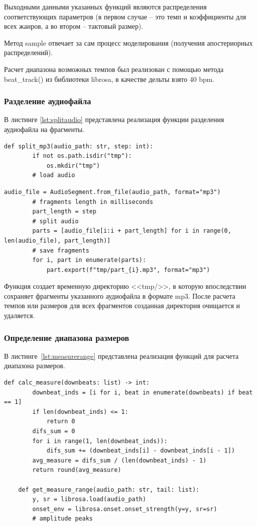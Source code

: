 Выходными данными указанных функций являются распределения соответствующих параметров (в первом случае -- это темп и коэффициенты для всех жанров, а во втором -- тактовый размер).

Метод sample отвечает за сам процесс моделирования (получения апостериорных распределений).

Расчет диапазона возможных темпов был реализован с помощью метода beat\_track() из библиотеки librosa, в качестве дельты взято 40 bpm.

\subsubsection{Разделение аудиофайла}

В листинге \ref{lst:splitaudio} представлена реализация функции разделения аудиофайла на фрагменты.

\begin{lstlisting}[label={lst:splitaudio}, caption={разделение аудиофайла на фрагменты}]
	def split_mp3(audio_path: str, step: int):
		if not os.path.isdir("tmp"):
			os.mkdir("tmp")
		# load audio
\end{lstlisting}

\begin{lstlisting}[label={lst:splitaudio}, caption={разделение аудиофайла на фрагменты (продолжение)}]
		audio_file = AudioSegment.from_file(audio_path, format="mp3")
		# fragments length in milliseconds
		part_length = step
		# split audio
		parts = [audio_file[i:i + part_length] for i in range(0, len(audio_file), part_length)]
		# save fragments
		for i, part in enumerate(parts):
			part.export(f"tmp/part_{i}.mp3", format="mp3")
\end{lstlisting}

Функция создает временную директорию <<tmp/>>, в которую впоследствии сохраняет фрагменты указанного аудиофайла в формате mp3. После расчета темпов или размеров для всех фрагментов созданная директория очищается и удаляется.

\subsubsection{Определение диапазона размеров}

В листинге~\ref{lst:measurerange} представлена реализация функций для расчета диапазона размеров.

\begin{lstlisting}[label={lst:measurerange}, caption={определение диапазона размеров}]
	def calc_measure(downbeats: list) -> int:
		downbeat_inds = [i for i, beat in enumerate(downbeats) if beat == 1]
		if len(downbeat_inds) <= 1:
			return 0
		difs_sum = 0
		for i in range(1, len(downbeat_inds)):
			difs_sum += (downbeat_inds[i] - downbeat_inds[i - 1])
		avg_measure = difs_sum / (len(downbeat_inds) - 1)
		return round(avg_measure)
	
	def get_measure_range(audio_path: str, tail: list):
		y, sr = librosa.load(audio_path)
		onset_env = librosa.onset.onset_strength(y=y, sr=sr)
		# amplitude peaks
\end{lstlisting}

